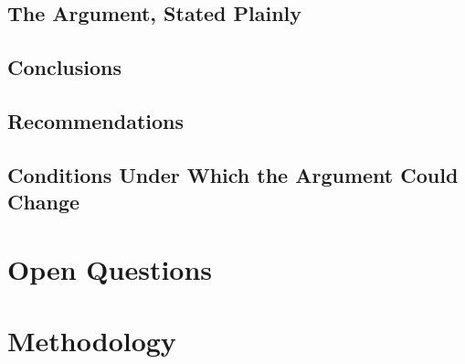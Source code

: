 \documentclass[11pt]{article}
\begin{document}
\subsection{The Argument, Stated Plainly}

\subsection{Conclusions}

\subsection{Recommendations}

\subsection{Conditions Under Which the Argument Could Change}

\section{Open Questions}

\appendix

\section{Methodology}



\end{document}
